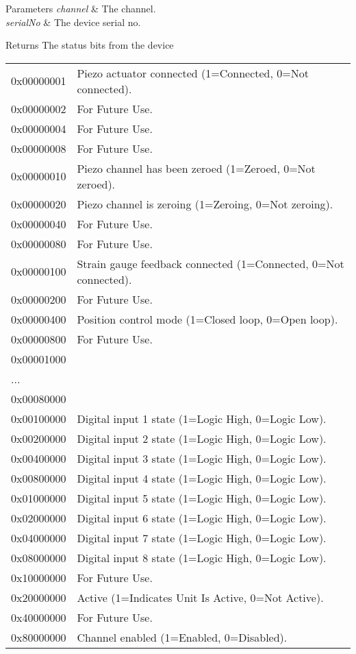 \begin{DoxyParams}{Parameters}
{\em channel} & The channel. \\
\hline
{\em serial\+No} & The device serial no. \\
\hline
\end{DoxyParams}
\begin{DoxyReturn}{Returns}
The status bits from the device \tabulinesep=1mm
\begin{longtabu} spread 0pt [c]{*2{|X[-1]}|}
\hline
0x00000001&Piezo actuator connected (1=Connected, 0=Not connected). \\
0x00000002&For Future Use. \\
0x00000004&For Future Use. \\
0x00000008&For Future Use. \\
0x00000010&Piezo channel has been zeroed (1=Zeroed, 0=Not zeroed). \\
0x00000020&Piezo channel is zeroing (1=Zeroing, 0=Not zeroing). \\
0x00000040&For Future Use. \\
0x00000080&For Future Use. \\
0x00000100&Strain gauge feedback connected (1=Connected, 0=Not connected). \\
0x00000200&For Future Use. \\
0x00000400&Position control mode (1=Closed loop, 0=Open loop). \\
0x00000800&For Future Use. \\
0x00001000&\\
...&\\
0x00080000&\\
0x00100000&Digital input 1 state (1=Logic High, 0=Logic Low). \\
0x00200000&Digital input 2 state (1=Logic High, 0=Logic Low). \\
0x00400000&Digital input 3 state (1=Logic High, 0=Logic Low). \\
0x00800000&Digital input 4 state (1=Logic High, 0=Logic Low). \\
0x01000000&Digital input 5 state (1=Logic High, 0=Logic Low). \\
0x02000000&Digital input 6 state (1=Logic High, 0=Logic Low). \\
0x04000000&Digital input 7 state (1=Logic High, 0=Logic Low). \\
0x08000000&Digital input 8 state (1=Logic High, 0=Logic Low). \\
0x10000000&For Future Use. \\
0x20000000&Active (1=Indicates Unit Is Active, 0=Not Active). \\
0x40000000&For Future Use. \\
0x80000000&Channel enabled (1=Enabled, 0=Disabled). \\
\end{longtabu}



\end{DoxyReturn}
